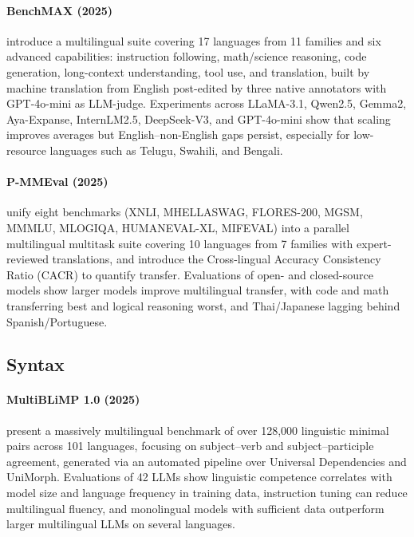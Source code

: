 \documentclass[letterpaper]{article}
\begin{document}
\paragraph{BenchMAX (2025)} \citet{huang2025benchmaxcomprehensivemultilingualevaluation} introduce a multilingual suite covering 17 languages from 11 families and six advanced capabilities: instruction following, math/science reasoning, code generation, long-context understanding, tool use, and translation, built by machine translation from English post-edited by three native annotators with GPT-4o-mini as LLM-judge. Experiments across LLaMA-3.1, Qwen2.5, Gemma2, Aya-Expanse, InternLM2.5, DeepSeek-V3, and GPT-4o-mini show that scaling improves averages but English--non-English gaps persist, especially for low-resource languages such as Telugu, Swahili, and Bengali.

\paragraph{P-MMEval (2025)} \citet{zhang2025pmmevalparallelmultilingualmultitask} unify eight benchmarks (XNLI, MHELLASWAG, FLORES-200, MGSM, MMMLU, MLOGIQA, HUMANEVAL-XL, MIFEVAL) into a parallel multilingual multitask suite covering 10 languages from 7 families with expert-reviewed translations, and introduce the Cross-lingual Accuracy Consistency Ratio (CACR) to quantify transfer. Evaluations of open- and closed-source models show larger models improve multilingual transfer, with code and math transferring best and logical reasoning worst, and Thai/Japanese lagging behind Spanish/Portuguese.

\subsection{Syntax}

\paragraph{MultiBLiMP 1.0 (2025)} \citet{jumelet2025multiblimp10massivelymultilingual} present a massively multilingual benchmark of over 128,000 linguistic minimal pairs across 101 languages, focusing on subject--verb and subject--participle agreement, generated via an automated pipeline over Universal Dependencies and UniMorph. Evaluations of 42 LLMs show linguistic competence correlates with model size and language frequency in training data, instruction tuning can reduce multilingual fluency, and monolingual models with sufficient data outperform larger multilingual LLMs on several languages.
\end{document}
